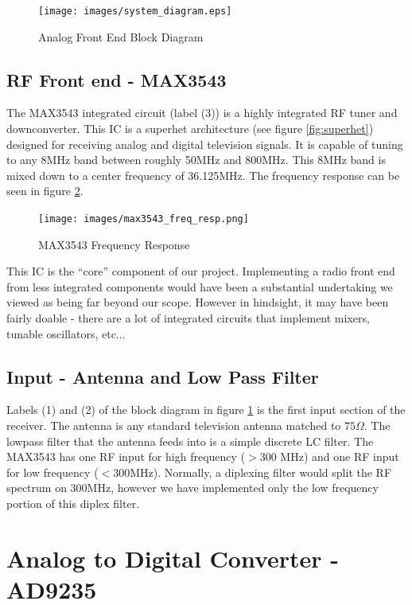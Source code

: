 \documentclass[a4paper, 12pt, notitlepage]{article}
\begin{document}
\begin{figure}
  \centering
  \caption{Analog Front End Block Diagram}
  \label{fig:analog_block_diagram}
  \texttt{[image: images/system\_diagram.eps]}
\end{figure}

\subsection{RF Front end - MAX3543}
The MAX3543 integrated circuit \cite{max3543} (label (3)) is a highly integrated RF tuner and downconverter.  This IC is a superhet architecture (see figure \ref{fig:superhet}) designed for receiving analog and digital television signals.  It is capable of tuning to any 8MHz band between roughly 50MHz and 800MHz.  This 8MHz band is mixed down to a center frequency of 36.125MHz.  The frequency response can be seen in figure \ref{fig:max3543_freq_resp}.

\begin{figure}
  \texttt{[image: images/max3543\_freq\_resp.png]}
  \caption{MAX3543 Frequency Response}
  \label{fig:max3543_freq_resp}
\end{figure}

This IC is the ``core'' component of our project.  Implementing a radio front end from less integrated components would have been a substantial undertaking we viewed as being far beyond our scope.  However in hindsight, it may have been fairly doable - there are a lot of integrated circuits that implement mixers, tunable oscillators, etc...

\subsection{Input - Antenna and Low Pass Filter}
Labels (1) and (2) of the block diagram in figure \ref{fig:analog_block_diagram} is the first input section of the receiver.  The antenna is any standard television antenna matched to $75\Omega$.  The lowpass filter that the antenna feeds into is a simple discrete LC filter.  The MAX3543 has one RF input for high frequency ($>$300 MHz) and one RF input for low frequency ($<$300MHz).  Normally, a diplexing filter would split the RF spectrum on 300MHz, however we have implemented only the low frequency portion of this diplex filter.


\section{Analog to Digital Converter - AD9235}
\end{document}
